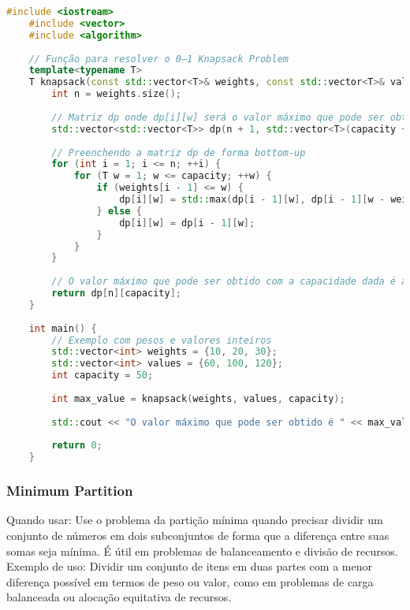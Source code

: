 \documentclass{article}
\begin{document}
\begin{lstlisting}[language=C++, caption=0–1 Knapsack Problem]
    #include <iostream>
    #include <vector>
    #include <algorithm>
    
    // Função para resolver o 0–1 Knapsack Problem
    template<typename T>
    T knapsack(const std::vector<T>& weights, const std::vector<T>& values, T capacity) {
        int n = weights.size();
        
        // Matriz dp onde dp[i][w] será o valor máximo que pode ser obtido com os primeiros i itens e capacidade w
        std::vector<std::vector<T>> dp(n + 1, std::vector<T>(capacity + 1, 0));
    
        // Preenchendo a matriz dp de forma bottom-up
        for (int i = 1; i <= n; ++i) {
            for (T w = 1; w <= capacity; ++w) {
                if (weights[i - 1] <= w) {
                    dp[i][w] = std::max(dp[i - 1][w], dp[i - 1][w - weights[i - 1]] + values[i - 1]);
                } else {
                    dp[i][w] = dp[i - 1][w];
                }
            }
        }
    
        // O valor máximo que pode ser obtido com a capacidade dada é armazenado em dp[n][capacity]
        return dp[n][capacity];
    }
    
    int main() {
        // Exemplo com pesos e valores inteiros
        std::vector<int> weights = {10, 20, 30};
        std::vector<int> values = {60, 100, 120};
        int capacity = 50;
    
        int max_value = knapsack(weights, values, capacity);
    
        std::cout << "O valor máximo que pode ser obtido é " << max_value << std::endl;
    
        return 0;
    }
\end{lstlisting}

\subsubsection{Minimum Partition}

Quando usar: Use o problema da partição mínima quando precisar dividir um conjunto de números em dois subconjuntos de forma que a diferença entre suas somas seja mínima. É útil em problemas de balanceamento e divisão de recursos.
\\Exemplo de uso: Dividir um conjunto de itens em duas partes com a menor diferença possível em termos de peso ou valor, como em problemas de carga balanceada ou alocação equitativa de recursos.
\end{document}
